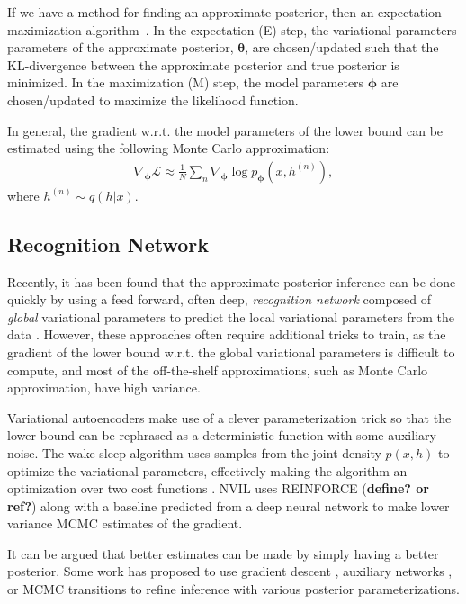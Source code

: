 \documentclass{article} %
\newcommand{\vects}[1]{\boldsymbol{#1}}
\newcommand{\TT}[0]{\vects{\theta}}
\newcommand{\PP}[0]{\vects{\phi}}
\newcommand{\LL}[0]{\mathcal{L}}
\begin{document}
If we have a method for finding an approximate posterior, then an
expectation-maximization
algorithm~\citep[EM,][]{dempster1977maximum, neal1998view}.  In the expectation (E)
step, the variational parameters parameters of the approximate posterior, $\TT$,
are chosen/updated such that the KL-divergence between the approximate posterior and
true posterior is minimized. In the maximization (M) step, the model parameters
$\PP$ are chosen/updated to maximize the likelihood function.

In general, the gradient w.r.t. the model parameters of the lower bound can be
estimated using the following Monte Carlo approximation:
\begin{align}
\nabla_{\PP} \LL \approx \frac{1}{N} \sum_n \nabla_{\PP} \log p_{\PP}(x, h^{(n)}),
\end{align}
where $h^{(n)} \sim q(h|x)$.

\subsection{Recognition Network}

Recently, it has been found that the approximate posterior inference can be done
quickly by using a feed forward, often deep, \emph{recognition network} composed
of \emph{global} variational parameters to predict the local variational
parameters from the data \citep[see,
e.g.,][]{kingma2013auto,mnih2014neural,rezende2014stochastic}. However, these
approaches often require additional tricks to train, as the gradient of the
lower bound w.r.t. the global variational parameters is difficult to compute,
and most of the off-the-shelf approximations, such as Monte Carlo approximation,
have high variance. 

Variational autoencoders \citep[VAE,][]{kingma2013auto} make use of a clever
parameterization trick so that the lower bound can be rephrased as a
deterministic function with some auxiliary noise. The wake-sleep algorithm uses
samples from the joint density $p(x, h)$ to optimize the variational parameters,
effectively making the algorithm an optimization over two cost functions
\citep{hinton1995wake}. NVIL
uses REINFORCE (\textbf{define? or ref?}) along with a baseline predicted from a deep neural network to
make lower variance MCMC estimates of the gradient.

It can be argued that better estimates can be made by simply having a better
posterior. Some work has proposed to use gradient descent
\citep{hoffman2013stochastic}, auxiliary networks
\citep{rezende2015variational}, or MCMC transitions \citep{salimans2014markov}
to refine inference with various posterior parameterizations. 
\end{document}
